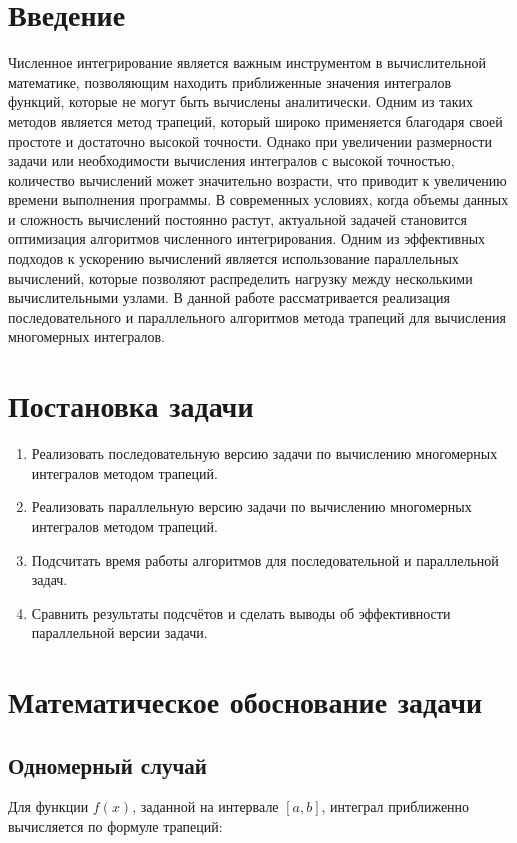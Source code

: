 \documentclass{article}
\begin{document}
\newpage

\tableofcontents
\newpage

\section{Введение}
Численное интегрирование является важным инструментом в вычислительной математике, позволяющим находить приближенные значения интегралов функций, которые не могут быть вычислены аналитически. Одним из таких методов является метод трапеций, который широко применяется благодаря своей простоте и достаточно высокой точности. Однако при увеличении размерности задачи или необходимости вычисления интегралов с высокой точностью, количество вычислений может значительно возрасти, что приводит к увеличению времени выполнения программы. В современных условиях, когда объемы данных и сложность вычислений постоянно растут, актуальной задачей становится оптимизация алгоритмов численного интегрирования. Одним из эффективных подходов к ускорению вычислений является использование параллельных вычислений, которые позволяют распределить нагрузку между несколькими вычислительными узлами. В данной работе рассматривается реализация последовательного и параллельного алгоритмов метода трапеций для вычисления многомерных интегралов.
   \vspace{1.0cm}
\section{Постановка задачи}
\noindent
\begin{enumerate}
    \item Реализовать последовательную версию задачи по вычислению многомерных интегралов методом трапеций.
    \item Реализовать параллельную версию задачи по вычислению многомерных интегралов методом трапеций.
    \item Подсчитать время работы алгоритмов для последовательной и параллельной задач.
    \item Сравнить результаты подсчётов и сделать выводы об эффективности параллельной версии задачи.
\end{enumerate}
   \vspace{1.0cm}
\section{Математическое обоснование задачи}

\subsection*{Одномерный случай}
Для функции \( f(x) \), заданной на интервале \([a, b]\), интеграл приближенно вычисляется по формуле трапеций:
\end{document}
